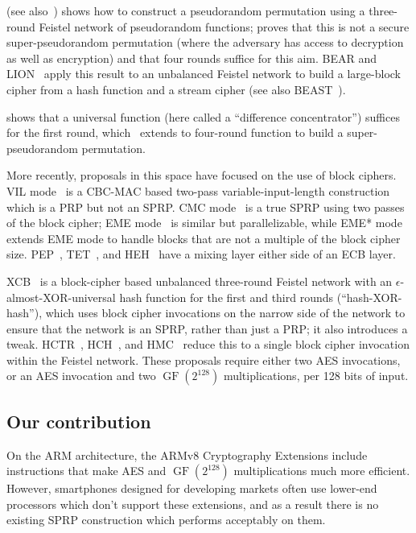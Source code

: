 \documentclass[letterpaper,luatex,11pt]{article}
\DeclareMathOperator{\GF}{GF}
\begin{document}
\cite{luby-rackoff} (see also~\cite{maurer-luby-rackoff,ppdes})
shows how to construct a pseudorandom permutation using a three-round Feistel
network of pseudorandom functions;
proves that this is not a secure super-pseudorandom permutation (where the adversary
has access to decryption as well as encryption) and that four rounds suffice for this aim.
BEAR and LION~\cite{bearlion} apply this result to an unbalanced Feistel network to build a
large-block cipher from a hash function and a stream cipher (see also BEAST~\cite{beast}).

\cite{fasterlr} shows that a universal function (here called a ``difference concentrator'')
suffices for the first round, which~\cite{NaorReingold} extends to four-round function
to build a super-pseudorandom permutation.

More recently, proposals in this space have focused on the use of
block ciphers. VIL mode~\cite{brvil} is a CBC-MAC based two-pass variable-input-length construction which
is a PRP but not an SPRP. CMC mode~\cite{cmc} is a true SPRP using two passes of the block cipher;
EME mode~\cite{eme} is similar but parallelizable, while
EME* mode~\cite{emestar} extends EME mode to handle blocks that are not a multiple of the block
cipher size. PEP~\cite{pep}, TET~\cite{tet}, and HEH~\cite{heh} have a mixing layer either side of
an ECB layer.

XCB~\cite{xcb} is a block-cipher based unbalanced three-round Feistel network with an
$\epsilon$-almost-XOR-universal hash function for the first and third rounds
(``hash-XOR-hash''),
which uses block
cipher invocations on the narrow side of the network to ensure that the network is an SPRP, rather
than just a PRP; it also introduces a tweak.
HCTR~\cite{hctr,hctr2}, HCH~\cite{hch}, and HMC~\cite{hmc} reduce this to a single
block cipher invocation within the Feistel network.
These proposals require
either two AES invocations, or an AES invocation and two $\GF(2^{128})$ multiplications,
per 128 bits of input.

\subsection{Our contribution}
On the ARM architecture, the ARMv8 Cryptography Extensions include instructions that make
AES and $\GF(2^{128})$ multiplications much more efficient. However,
smartphones designed for developing markets
often use lower-end processors which
don't support these extensions, and as a result there is no existing SPRP construction which performs
acceptably on them.
\end{document}
